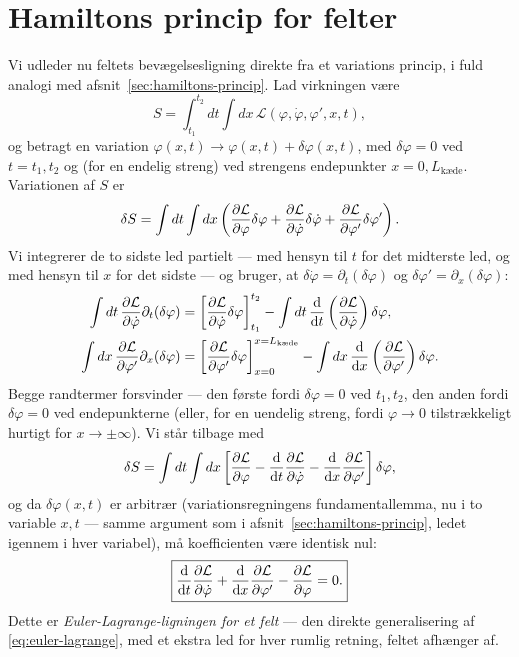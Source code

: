 \section{Hamiltons princip for felter}

Vi udleder nu feltets bevægelsesligning direkte fra et variations\-
princip, i fuld analogi med afsnit~\ref{sec:hamiltons-princip}. Lad
virkningen være
\begin{equation}
  S = \int_{t_1}^{t_2}dt\int dx\,\mathcal{L}(\varphi,\dot\varphi,\varphi',x,t),
\end{equation}
og betragt en variation $\varphi(x,t)\to\varphi(x,t)+\delta\varphi(x,t)$,
med $\delta\varphi=0$ ved $t=t_1,t_2$ og (for en endelig streng) ved
strengens endepunkter $x=0,L_{\text{kæde}}$. Variationen af $S$ er
\begin{equation}
  \delta S = \int dt\int dx\left(\pdv{\mathcal{L}}{\varphi}\delta\varphi
    + \pdv{\mathcal{L}}{\dot\varphi}\delta\dot\varphi
    + \pdv{\mathcal{L}}{\varphi'}\delta\varphi'\right).
\end{equation}
Vi integrerer de to sidste led partielt — med hensyn til $t$ for det
midterste led, og med hensyn til $x$ for det sidste — og bruger, at
$\delta\dot\varphi=\partial_t(\delta\varphi)$ og
$\delta\varphi'=\partial_x(\delta\varphi)$:
\begin{align}
  \int dt\,\pdv{\mathcal{L}}{\dot\varphi}\partial_t(\delta\varphi)
  &= \left[\pdv{\mathcal{L}}{\dot\varphi}\delta\varphi\right]_{t_1}^{t_2}
    - \int dt\,\dv{}{t}\left(\pdv{\mathcal{L}}{\dot\varphi}\right)\delta\varphi, \\
  \int dx\,\pdv{\mathcal{L}}{\varphi'}\partial_x(\delta\varphi)
  &= \left[\pdv{\mathcal{L}}{\varphi'}\delta\varphi\right]_{x=0}^{x=L_{\text{kæde}}}
    - \int dx\,\dv{}{x}\left(\pdv{\mathcal{L}}{\varphi'}\right)\delta\varphi.
\end{align}
Begge randtermer forsvinder — den første fordi $\delta\varphi=0$ ved
$t_1,t_2$, den anden fordi $\delta\varphi=0$ ved endepunkterne (eller,
for en uendelig streng, fordi $\varphi\to0$ tilstrækkeligt hurtigt for
$x\to\pm\infty$). Vi står tilbage med
\begin{equation}
  \delta S = \int dt\int dx\left[\pdv{\mathcal{L}}{\varphi}
    - \dv{}{t}\pdv{\mathcal{L}}{\dot\varphi} - \dv{}{x}\pdv{\mathcal{L}}{\varphi'}\right]\delta\varphi,
\end{equation}
og da $\delta\varphi(x,t)$ er arbitrær (variationsregningens
fundamentallemma, nu i to variable $x,t$ — samme argument som i
afsnit~\ref{sec:hamiltons-princip}, ledet igennem i hver variabel),
må koefficienten være identisk nul:
\begin{equation}
  \boxed{\dv{}{t}\pdv{\mathcal{L}}{\dot\varphi} + \dv{}{x}\pdv{\mathcal{L}}{\varphi'} - \pdv{\mathcal{L}}{\varphi} = 0.}
  \label{eq:euler-lagrange-felt}
\end{equation}
Dette er \emph{Euler-Lagrange-ligningen for et felt} — den direkte
generalisering af \eqref{eq:euler-lagrange}, med et ekstra led for
hver rumlig retning, feltet afhænger af.

